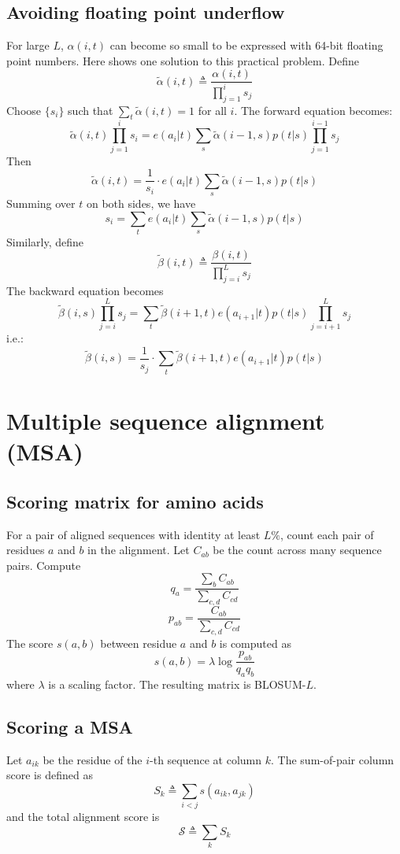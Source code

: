 \documentclass[10pt]{article}
\begin{document}
\subsection{Avoiding floating point underflow}

For large $L$, $\alpha(i,t)$ can become so small to be expressed with 64-bit
floating point numbers. Here shows one solution to this practical problem.
Define
$$
\tilde{\alpha}(i,t)\triangleq\frac{\alpha(i,t)}{\prod_{j=1}^is_j}
$$
Choose $\{s_i\}$ such that $\sum_t\tilde{\alpha}(i,t)=1$ for all $i$. The
forward equation becomes:
$$
\tilde{\alpha}(i,t)\prod_{j=1}^is_i=e(a_i|t)\sum_s\tilde{\alpha}(i-1,s)p(t|s)\prod_{j=1}^{i-1}s_j
$$
Then
$$
\tilde{\alpha}(i,t)=\frac{1}{s_i}\cdot e(a_i|t)\sum_s\tilde{\alpha}(i-1,s)p(t|s)
$$
Summing over $t$ on both sides, we have
$$
s_i=\sum_te(a_i|t)\sum_s\tilde{\alpha}(i-1,s)p(t|s)
$$
Similarly, define
$$
\tilde{\beta}(i,t)\triangleq\frac{\beta(i,t)}{\prod_{j=i}^Ls_j}
$$
The backward equation becomes
$$
\tilde{\beta}(i,s)\prod_{j=i}^Ls_j=\sum_t\tilde{\beta}(i+1,t)e(a_{i+1}|t)p(t|s)\prod_{j=i+1}^Ls_j
$$
i.e.:
$$
\tilde{\beta}(i,s)=\frac{1}{s_j}\cdot\sum_t\tilde{\beta}(i+1,t)e(a_{i+1}|t)p(t|s)
$$

\newpage

\section{Multiple sequence alignment (MSA)}

\subsection{Scoring matrix for amino acids}

For a pair of aligned sequences with identity at least $L\%$, count each pair of
residues $a$ and $b$ in the alignment. Let $C_{ab}$ be the count across many
sequence pairs. Compute
$$
q_a=\frac{\sum_b C_{ab}}{\sum_{c,d}C_{cd}}
$$
$$
p_{ab}=\frac{C_{ab}}{\sum_{c,d}C_{cd}}
$$
The score $s(a,b)$ between residue $a$ and $b$ is computed as
$$
s(a,b)=\lambda\log\frac{p_{ab}}{q_aq_b}
$$
where $\lambda$ is a scaling factor. The resulting matrix is BLOSUM-$L$.

\subsection{Scoring a MSA}

Let $a_{ik}$ be the residue of the $i$-th sequence at column $k$. The
sum-of-pair column score is defined as
$$
S_k\triangleq\sum_{i<j}s(a_{ik},a_{jk})
$$
and the total alignment score is
$$
\mathcal{S}\triangleq\sum_k S_k
$$
\end{document}
